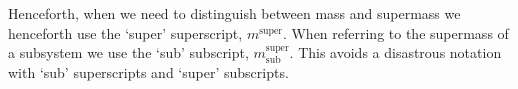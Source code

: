 Henceforth, when we need to distinguish between mass and supermass we henceforth use the `super' superscript, $m^{\text{super}}$.  When referring to the supermass of a subsystem we use the `sub' subscript, $m^{\text{super}}_{\text{sub}}$.  This avoids a disastrous notation with `sub' superscripts and `super' subscripts.

